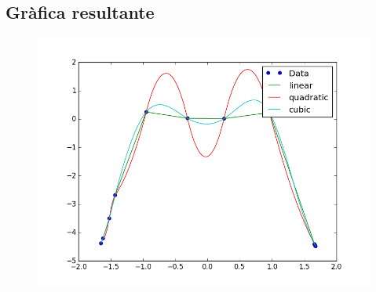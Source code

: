 \documentclass[12pt]{article}
\begin{document}
\subsection{Gràfica resultante}
\begin{figure}[H]
\centering
\includegraphics[scale=.8]{f4}
\end{figure}
\end{document}
